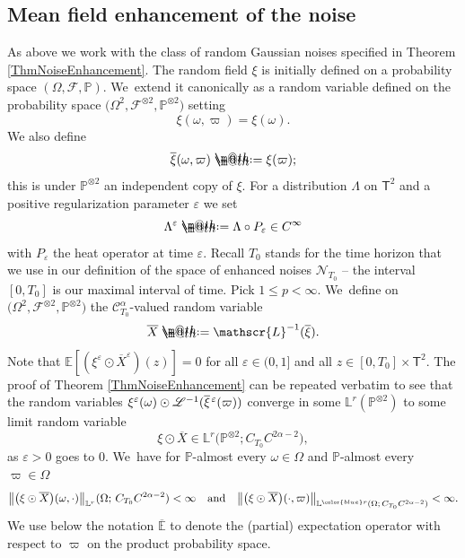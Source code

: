 \documentclass[10pt]{amsart}
\makeatletter
\theoremstyle{definition}
\let\epsilon\varepsilon
\newcommand\bbE{\mathbb{E}}
\newcommand{\mcF}{\mathcal{F}}
\newcommand{\mcN}{\mathcal{N}}
\newcommand{\bbL}{\mathbb{L}}
\newcommand{\bbP}{\mathbb{P}}
\newcommand{\scrC}{\ensuremath{\mathscr{C}}}
\newcommand*{\defeq}{\mathrel{\rlap{%
\raisebox{0.3ex}{$\m@th\cdot$}}%
\raisebox{-0.3ex}{$\m@th\cdot$}}%
=}
\newcommand{\scrL}{\mathscr{L}}
\makeatother
\begin{document}
\subsection{Mean field enhancement of the noise}
\label{SubsectionEnhancedNoise}

As above we work with the class of random Gaussian noises specified in Theorem \ref{ThmNoiseEnhancement}. The random field $\xi$ is initially defined on a probability space $(\Omega,\mcF,\mathbb{P})$. We~extend it canonically as a random variable defined on the probability space $\bigl(\Omega^2, \mcF^{\otimes 2}, \mathbb{P}^{\otimes 2}\bigr)$ setting
\[
\xi(\omega,\varpi) = \xi(\omega).
\]
We also define
\[
\overline{\xi}(\omega, \varpi) \defeq \xi(\varpi);
\]
this is under $\mathbb{P}^{\otimes 2}$ an independent copy of $\xi$. For a distribution $\Lambda$ on $\mathsf{T}^2$ and a positive regularization parameter $\epsilon$ we set
\[
\Lambda^\epsilon \defeq \Lambda\circ P_\epsilon \in C^\infty
\]
with $P_\epsilon$ the heat operator at time $\epsilon$. Recall $T_0$ stands for the time horizon that we use in our definition of the space of enhanced noises ${{\boldsymbol{\mcN}}_{T_0}}$ -- the interval $[0,T_0]$ is our maximal interval of time. Pick $1\leq p<\infty$. We~define on $\bigl(\Omega^2, \mcF^{\otimes 2}, \mathbb{P}^{\otimes 2}\bigr)$ the $\scrC^\alpha_{T_0}$-valued random variable
\[
\overline{X} \defeq \scrL^{-1}(\overline\xi).
\]
Note that $\bbE[(\xi^\epsilon\odot \overline{X}^\epsilon)(z)]=0$ for all $\epsilon\in(0,1]$ and all $z\in [0,T_0]\times\mathsf{T}^2$. The proof of Theorem \ref{ThmNoiseEnhancement} can be repeated verbatim to see that the random variables $\xi^\epsilon(\omega) \odot\nobreak \scrL^{-1}(\overline{\xi}\hspace{1pt}^\epsilon(\varpi))$ converge in some $\bbL^ r(\bbP^{\otimes 2})$ to some limit random variable
\[
\xi\odot\overline{X} \in \bbL^ r\bigl(\mathbb{P}^{\otimes 2}; C_{T_0}C^{2\alpha-2}\bigr),
\]
as $\epsilon>0$ goes to $0$. We~have for $\mathbb{P}$-almost every $\omega\in\Omega$ and $\mathbb{P}$-almost every $\varpi\in\Omega$
\[
\big\Vert \bigl(\xi\odot\overline{X}\bigr)(\omega,\cdot) \big\Vert_{\bbL^ r}(\Omega; \,C_{T_0}C^{2\alpha-2}) < \infty
\quad
\text{and}
\quad
\big\Vert \bigl(\xi\odot\overline{X}\bigr)(\cdot,\varpi) \big\Vert_{\bbL^{ \color{blue} r}(\Omega; \,C_{T_0}C^{2\alpha-2})} < \infty.
\]
We use below the notation $\overline{\bbE}$ to denote the (partial) expectation operator with respect to $\varpi$ on the product probability space.
\end{document}
